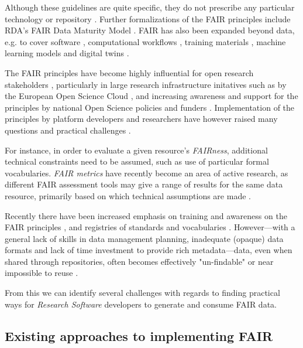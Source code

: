 Although these guidelines are quite specific, they do not prescribe any particular technology or repository \cite{Mons 2017}. Further formalizations of the FAIR principles include RDA's FAIR Data Maturity Model \cite{FAIR Maturity 2020,Bahui 2020}. FAIR has also been expanded beyond data, e.g. to cover software \cite{Katz 2021b}, computational workflows \cite{Goble 2020}, training materials \cite{Garcia 2020a}, machine learning models \cite{Duarte 2023} and digital twins \cite{Schultes 2022}. 

The FAIR principles have become highly influential for open research stakeholders \cite{Jacobsen 2020}, particularly in large research infrastructure initatives such as by the European Open Science Cloud  \cite{Schouppe 2018}, and increasing awareness and support for the principles by national Open Science policies and funders \cite{Davidson 2019,Davidson 2022}.
Implementation of the principles by platform developers and researchers have however raised many questions and practical challenges \cite{Mons 2020,Riungu-Kalliosaari 2022}. 

For instance, in order to evaluate a given resource's \emph{FAIRness}, additional technical constraints need to be assumed, such as use of particular formal vocabularies. \emph{FAIR metrics} \cite{Wilkinson 2018,Devaraju 2021} have recently become an area of active research, as different FAIR assessment tools may give a range of results for the same data resource, primarily based on which technical assumptions are made \cite{Wilkinson 2022a,Verburg 2023}.

Recently there have been increased emphasis on training and awareness on the FAIR principles \cite{Shanahan 2021,Rocca-Serra 2023}, and registries of standards and vocabularies \cite{Sansone 2019}.
However---with a general lack of skills in data management planning, inadequate (opaque) data formats and lack of time investment to provide rich metadata---data, even when shared through repositories, often becomes effectively "un-findable" or near impossible to reuse \cite{Carballo-Garcia 2022}.

From this we can identify several challenges with regards to finding practical ways for \emph{Research Software} developers to generate and consume FAIR data.



\subsection{Existing approaches to implementing FAIR}

